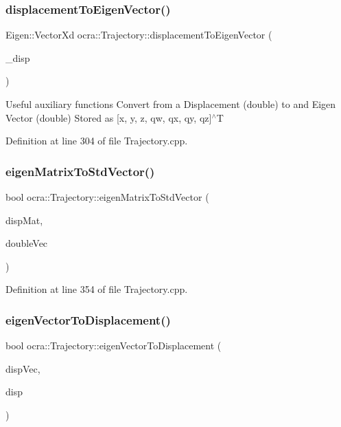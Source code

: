 \subsubsection{\texorpdfstring{displacement\+To\+Eigen\+Vector()}{displacementToEigenVector()}}
{\footnotesize\ttfamily Eigen\+::\+Vector\+Xd ocra\+::\+Trajectory\+::displacement\+To\+Eigen\+Vector (\begin{DoxyParamCaption}\item[{Eigen\+::\+Displacementd \&}]{\+\_\+disp }\end{DoxyParamCaption})}

Useful auxiliary functions Convert from a Displacement (double) to and Eigen Vector (double) Stored as \mbox{[}x, y, z, qw, qx, qy, qz\mbox{]}$^\wedge$T

Definition at line 304 of file Trajectory.\+cpp.

\hypertarget{classocra_1_1Trajectory_a2a659e10b5701c8cd50a53ab00e69023}{}\label{classocra_1_1Trajectory_a2a659e10b5701c8cd50a53ab00e69023} 
\subsubsection{\texorpdfstring{eigen\+Matrix\+To\+Std\+Vector()}{eigenMatrixToStdVector()}}
{\footnotesize\ttfamily bool ocra\+::\+Trajectory\+::eigen\+Matrix\+To\+Std\+Vector (\begin{DoxyParamCaption}\item[{const Eigen\+::\+Matrix\+Xd \&}]{disp\+Mat,  }\item[{std\+::vector$<$ double $>$ \&}]{double\+Vec }\end{DoxyParamCaption})}



Definition at line 354 of file Trajectory.\+cpp.

\hypertarget{classocra_1_1Trajectory_ac8f9c3fdb888707304a817866f13c244}{}\label{classocra_1_1Trajectory_ac8f9c3fdb888707304a817866f13c244} 
\subsubsection{\texorpdfstring{eigen\+Vector\+To\+Displacement()}{eigenVectorToDisplacement()}}
{\footnotesize\ttfamily bool ocra\+::\+Trajectory\+::eigen\+Vector\+To\+Displacement (\begin{DoxyParamCaption}\item[{const Eigen\+::\+Vector\+Xd \&}]{disp\+Vec,  }\item[{Eigen\+::\+Displacementd \&}]{disp }\end{DoxyParamCaption})}



